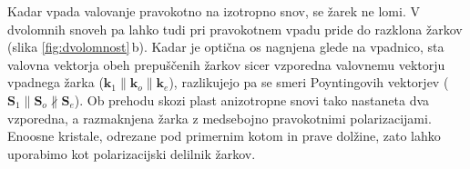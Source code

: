 Kadar vpada valovanje pravokotno na izotropno snov, se žarek ne lomi. V 
dvolomnih snoveh pa lahko tudi pri pravokotnem vpadu pride do razklona žarkov (slika
\ref{fig:dvolomnost}\,b). Kadar je optična os nagnjena glede na vpadnico, sta valovna vektorja
obeh prepuščenih žarkov sicer vzporedna valovnemu vektorju vpadnega žarka ($\mathbf{k}_1 \parallel
\mathbf{k}_o \parallel \mathbf{k}_e$), razlikujejo pa se smeri Poyntingovih vektorjev
($\mathbf{S}_1 \parallel \mathbf{S}_o \nparallel \mathbf{S}_e$). Ob prehodu skozi 
plast anizotropne snovi tako nastaneta dva vzporedna, a razmaknjena žarka z medsebojno
pravokotnimi polarizacijami. Enoosne kristale, odrezane pod primernim kotom in prave dolžine,
zato lahko uporabimo kot polarizacijski delilnik žarkov.

